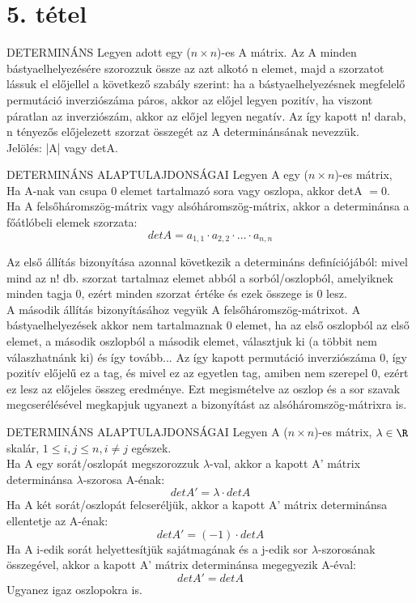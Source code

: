 \section{5. tétel}

\begin{definicio}{DETERMINÁNS}
Legyen adott egy ($n \times n$)-es A mátrix. Az A minden bástyaelhelyezésére
szorozzuk össze az azt alkotó n elemet, majd a szorzatot lássuk el előjellel
a következő szabály szerint: ha a bástyaelhelyezésnek megfelelő permutáció inverziószáma
páros, akkor az előjel legyen pozitív, ha viszont páratlan az inverziószám,
akkor az előjel legyen negatív. Az így kapott n! darab, n tényezős előjelezett szorzat
összegét az A determinánsának nevezzük. \\
Jelölés: |A| vagy detA.
\end{definicio}

\begin{tetel}{DETERMINÁNS ALAPTULAJDONSÁGAI}
Legyen A egy ($n \times n$)-es mátrix,\\
Ha A-nak van csupa 0 elemet tartalmazó sora vagy oszlopa, akkor detA $= 0$.\\
Ha A felsőháromszög-mátrix vagy alsóháromszög-mátrix, akkor a determinánsa a főátlóbeli elemek szorzata: $$det A = a_{1,1}\cdot a_{2,2}\cdot \ldots\cdot a_{n,n}$$
\end{tetel}

\begin{bizonyitas}{}
Az első állítás bizonyítása azonnal következik a determináns definíciójából: mivel mind az n! db. szorzat tartalmaz elemet abból a sorból/oszlopból, amelyiknek minden tagja 0, ezért minden szorzat értéke és ezek összege is 0 lesz.\\
A második állítás bizonyításához vegyük A felsőháromszög-mátrixot. A bástyaelhelyezések akkor nem tartalmaznak 0 elemet, ha az első oszlopból az első elemet, a második oszlopból a második elemet, választjuk ki (a többit nem válaszhatnánk ki) és így tovább... Az így kapott permutáció inverziószáma 0, így pozitív előjelű ez a tag, és mivel ez az egyetlen tag, amiben nem szerepel 0, ezért ez lesz az előjeles összeg eredménye. Ezt megismételve az oszlop és a sor szavak megcserélésével megkapjuk ugyanezt a bizonyítást az alsóháromszög-mátrixra is.
\end{bizonyitas}

\begin{tetel}{DETERMINÁNS ALAPTULAJDONSÁGAI}
Legyen A ($n\times n$)-es mátrix, $\lambda \in \R$ skalár, $1 \leq i,j\leq n, i \neq j$ egészek.\\
Ha A egy sorát/oszlopát megszorozzuk $\lambda$-val, akkor a kapott A' mátrix determinánsa $\lambda$-szorosa A-énak:$$detA' = \lambda\cdot detA$$
Ha A két sorát/oszlopát felcseréljük, akkor a kapott A' mátrix determinánsa ellentetje az A-énak:
$$detA' = (-1)\cdot detA$$
Ha A i-edik sorát helyettesítjük sajátmagának és a j-edik sor $\lambda$-szorosának összegével, akkor a kapott A' mátrix determinánsa megegyezik A-éval:
$$detA' = detA$$ Ugyanez igaz oszlopokra is.
\end{tetel}

